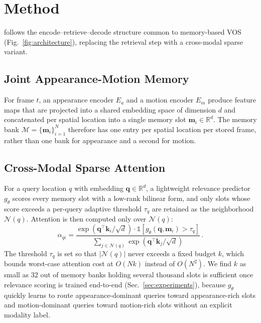\section{Method}
\methodname{} follows the encode--retrieve--decode structure common to memory-based VOS (Fig.~\ref{fig:architecture}), replacing the retrieval step with a cross-modal sparse variant.

\subsection{Joint Appearance-Motion Memory}
For frame $t$, an appearance encoder $E_a$ and a motion encoder $E_m$ produce feature maps that are projected into a shared embedding space of dimension $d$ and concatenated per spatial location into a single memory slot $\mathbf{m}_i \in \mathbb{R}^{d}$. The memory bank $\mathcal{M} = \{\mathbf{m}_i\}_{i=1}^{N}$ therefore has one entry per spatial location per stored frame, rather than one bank for appearance and a second for motion.

\subsection{Cross-Modal Sparse Attention}
For a query location $q$ with embedding $\mathbf{q} \in \mathbb{R}^{d}$, a lightweight relevance predictor $g_\theta$ scores every memory slot with a low-rank bilinear form, and only slots whose score exceeds a per-query adaptive threshold $\tau_q$ are retained as the neighborhood $\mathcal{N}(q)$. Attention is then computed only over $\mathcal{N}(q)$:
\begin{equation}
\label{eq:sparse-attn}
\alpha_{qi} = \frac{\exp\!\left(\mathbf{q}^{\top}\mathbf{k}_i / \sqrt{d}\right)\cdot \mathbb{1}\!\left[g_\theta(\mathbf{q}, \mathbf{m}_i) > \tau_q\right]}{\displaystyle\sum_{j \in \mathcal{N}(q)} \exp\!\left(\mathbf{q}^{\top}\mathbf{k}_j / \sqrt{d}\right)}\,.
\end{equation}
The threshold $\tau_q$ is set so that $|\mathcal{N}(q)|$ never exceeds a fixed budget $k$, which bounds worst-case attention cost at $O(Nk)$ instead of $O(N^2)$. We find $k$ as small as $32$ out of memory banks holding several thousand slots is sufficient once relevance scoring is trained end-to-end (Sec.~\ref{sec:experiments}), because $g_\theta$ quickly learns to route appearance-dominant queries toward appearance-rich slots and motion-dominant queries toward motion-rich slots without an explicit modality label.

